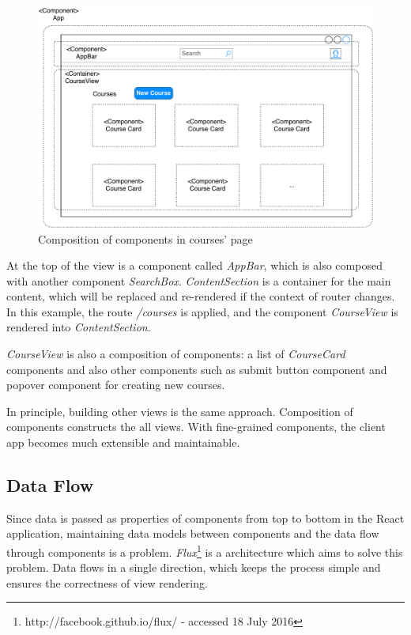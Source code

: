 \begin{figure}[!htbp]
  \centering
    \includegraphics[width=1\textwidth]{Figures/imp-course-view-composition.pdf}
  \caption{Composition of components in courses' page}
  \label{fig:course-view-composition-imp}
\end{figure}

At the top of the view is a component called \textit{AppBar}, which is also composed with another component \textit{SearchBox}. \textit{ContentSection} is a container for the main content, which will be replaced and re-rendered if the context of router changes. In this example, the route \textit{/courses} is applied, and the component \textit{CourseView} is rendered into \textit{ContentSection}. 

\textit{CourseView} is also a composition of components: a list of \textit{CourseCard} components and also other components such as submit button component and popover component for creating new courses. 

In principle, building other views is the same approach. Composition of components constructs the all views. With fine-grained components, the client app becomes much extensible and maintainable.


\subsection{Data Flow}\label{subsection:data-flow-react-imp}

Since data is passed as properties of components from top to bottom in the React application, maintaining data models between components and the data flow through components is a problem. \textit{Flux}\footnote{http://facebook.github.io/flux/ - accessed 18 July 2016} is a architecture which aims to solve this problem. Data flows in a single direction, which keeps the process simple and ensures the correctness of view rendering.

